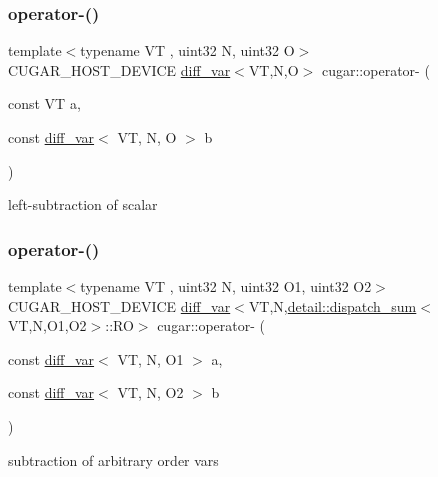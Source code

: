 \subsubsection{\texorpdfstring{operator-\/()}{operator-()}\hspace{0.1cm}{\footnotesize\ttfamily [3/4]}}
{\footnotesize\ttfamily template$<$typename VT , uint32 N, uint32 O$>$ \\
C\+U\+G\+A\+R\+\_\+\+H\+O\+S\+T\+\_\+\+D\+E\+V\+I\+CE \hyperlink{structcugar_1_1diff__var}{diff\+\_\+var}$<$VT,N,O$>$ cugar\+::operator-\/ (\begin{DoxyParamCaption}\item[{const VT}]{a,  }\item[{const \hyperlink{structcugar_1_1diff__var}{diff\+\_\+var}$<$ VT, N, O $>$}]{b }\end{DoxyParamCaption})\hspace{0.3cm}{\ttfamily [inline]}}

left-\/subtraction of scalar \mbox{\label{group___auto_diff_module_ga19939d139dd82ec7e4bc93925af5b2d0}} 
\subsubsection{\texorpdfstring{operator-\/()}{operator-()}\hspace{0.1cm}{\footnotesize\ttfamily [4/4]}}
{\footnotesize\ttfamily template$<$typename VT , uint32 N, uint32 O1, uint32 O2$>$ \\
C\+U\+G\+A\+R\+\_\+\+H\+O\+S\+T\+\_\+\+D\+E\+V\+I\+CE \hyperlink{structcugar_1_1diff__var}{diff\+\_\+var}$<$VT,N,\hyperlink{structcugar_1_1detail_1_1dispatch__sum}{detail\+::dispatch\+\_\+sum}$<$VT,N,O1,O2$>$\+::RO$>$ cugar\+::operator-\/ (\begin{DoxyParamCaption}\item[{const \hyperlink{structcugar_1_1diff__var}{diff\+\_\+var}$<$ VT, N, O1 $>$}]{a,  }\item[{const \hyperlink{structcugar_1_1diff__var}{diff\+\_\+var}$<$ VT, N, O2 $>$}]{b }\end{DoxyParamCaption})\hspace{0.3cm}{\ttfamily [inline]}}

subtraction of arbitrary order vars \mbox{\label{group___auto_diff_module_gab6673697063453e3a1805973fd2b3554}} 
